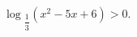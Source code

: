 \begin{ex}[type=inequality]
	\begin{condition}
		$ \log$\tiny$_{\dfrac{1}{3}}$\normalsize$(x^2 - 5x + 6) >0.$
	\end{condition}
\end{ex}
